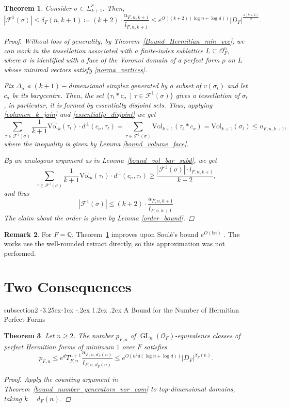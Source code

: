 \documentclass[11pt,a4paper,twoside]{amsart}
\makeatletter
\renewcommand{\subsection}{\@startsection
  {subsection}{2}{\z@}%
  {-3.25ex\@plus -1ex \@minus -.2ex}%
  {1.2ex \@plus .2ex}%
  {\normalfont\bfseries}}
\theoremstyle{plain}
\newtheorem{theorem}{\bfseries Theorem}[section]
\theoremstyle{definition}
\newtheorem{remark}[theorem]{\bfseries Remark}
\newcommand{\rint}[0]{\mathcal{O}_F}
\newcommand{\disc}[0]{D_F}
\newcommand{\facets}[0]{\mathcal{F}^1(\sigma)}
\newcommand{\GLo}[0]{\operatorname{GL}_n({\mathcal{O}_F})}
\newcommand{\vol}[0]{\mathrm{Vol}}
\renewcommand{\leq}{\leqslant}
\renewcommand{\geq}{\geqslant}
\makeatother
\begin{document}
\begin{theorem}
\label{bound_number_of_facets_vor_dom}
Consider $\sigma\in\Sigma_{k+1}^*$. 
Then, $$|\facets|\leq \delta_F(n,k+1) \coloneqq(k+2)\cdot \frac{u_{F,n,k+1}}{l_{F,n,k+1}} \leq e^{O((k+2)(\log n+\log d))}|\disc|^{\frac{4(k+2)}{d}}.$$
\begin{proof}
Without loss of generality, by Theorem~\ref{Bound_Hermitian_min_vec}, we can work in the tessellation associated with a finite-index sublattice $L\subseteq\rint^n$, where $\sigma$ is identified with a face of the Voronoi domain of a perfect form $\rho$ on $L$ whose minimal vectors satisfy \eqref{norma_vertices}.

Fix $\Delta_\sigma$ a $(k+1)-$dimensional simplex generated by a subset of $v(\sigma_t)$ and let $c_\sigma$ be its barycentre. Then, the set $\{\tau_t*c_\sigma \hspace{5pt} | \hspace{5pt} \tau\in\facets\}$ gives a tessellation of $\sigma_t$, in particular, it is formed by essentially disjoint sets. Thus, applying \eqref{volumen_k_join} and \eqref{essentially_disjoint} we get
$$\sum_{\tau\in\facets} \frac{1}{k+1} \vol_k(\tau_t) \cdot d^{\perp}(c_\sigma,\tau_t) = \sum_{\tau\in\facets} \vol_{k+1}(\tau_t * c_\sigma) = \vol_{k+1}(\sigma_t) \leq u_{F,n,k+1},$$
where the inequality is given by Lemma \ref{bound_volume_face}.

By an analogous argument as in Lemma~\ref{bound_vol_bar_subd}, we get
$$\sum_{\tau\in\facets} \frac{1}{k+1} \vol_k(\tau_t)\cdot d^{\perp}(c_\sigma,\tau_t)\geq \frac{|\facets|\cdot l_{F,n,k+1}}{k+2} ,$$
and thus 
$$|\facets|\leq (k+2)\cdot \frac{u_{F,n,k+1}}{l_{F,n,k+1}}$$
The claim about the order is given by Lemma \ref{order_bound}.
\end{proof}
\end{theorem}
\begin{remark}
    For $F=\mathbb{Q}$, Theorem~\ref{bound_number_of_facets_vor_dom} improves upon Soulé’s bound  $e^{O(kn)}$ \cite{soule_bounds}. The works \cite{Juliet_PHD,emery} use the well-rounded retract directly, so this approximation was not performed.
\end{remark}

\section{Two Consequences}
\subsection{A Bound for the Number of Hermitian Perfect Forms}
\begin{theorem}
\label{pf_bounds}
Let $n\geq2$. The number $p_{F,n}$ of $\GLo$-equivalence classes of perfect Hermitian forms of minimum $1$ over $F$ satisfies
$$p_{F,n}\leq e^dT_{F,n}^{n+1}\frac{u_{F,n,d_F(n)}}{l_{F,n,d_F(n)}}\leq e^{O(n^2d(\log n+\log d))}|\disc|^{\beta_F(n)}.$$
\begin{proof}
Apply the counting argument in Theorem~\ref{bound_number_generators_vor_com} to top-dimensional domains, taking $k=d_F(n)$. 
\end{proof}
\end{theorem}
\end{document}

